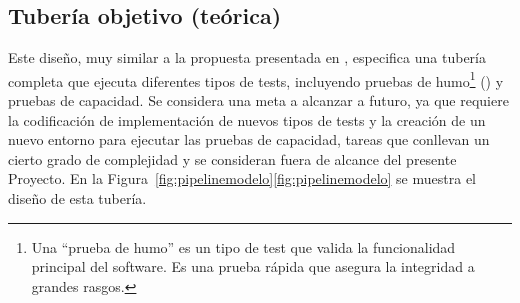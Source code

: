 \subsection{Tubería objetivo (teórica)}
%
Este diseño, muy similar a la propuesta presentada en
\cite{humblefarley}, especifica una tubería completa que ejecuta
diferentes tipos de tests, incluyendo pruebas de humo\footnote{ Una
  ``prueba de humo'' es un tipo de test que valida la funcionalidad
  principal del software. Es una prueba rápida que asegura la
  integridad a grandes rasgos.} () y pruebas de
capacidad. Se considera una meta a alcanzar a futuro, ya que requiere
la codificación de implementación de nuevos tipos de tests y la
creación de un nuevo entorno para ejecutar las pruebas de capacidad,
tareas que conllevan un cierto grado de complejidad y se consideran
fuera de alcance del presente Proyecto. En la
\iflatexml{}Figura~\ref{fig:pipelinemodelo}\else\autoref{fig:pipelinemodelo}\fi{}
se muestra el diseño de esta tubería.
